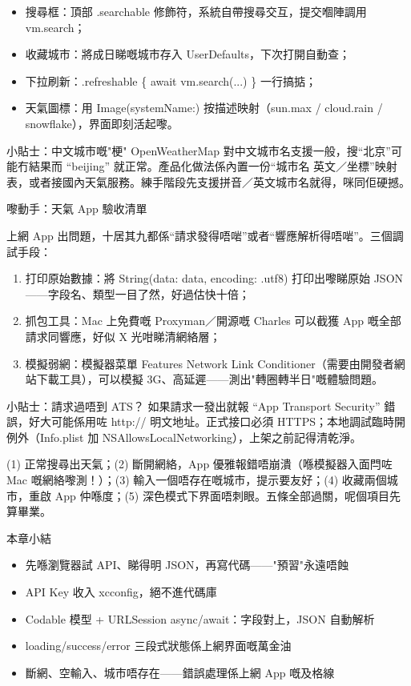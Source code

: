 
\begin{itemize}
  \item 搜尋框：頂部 .searchable 修飾符，系統自帶搜尋交互，提交嗰陣調用 vm.search；
  \item 收藏城市：將成日睇嘅城市存入 UserDefaults，下次打開自動查；
  \item 下拉刷新：.refreshable \{ await vm.search(...) \} 一行搞掂；
  \item 天氣圖標：用 Image(systemName:) 按描述映射（sun.max / cloud.rain / snowflake），界面即刻活起嚟。
\end{itemize}

\begin{tcbinfo}{小貼士：中文城市嘅"梗"}
OpenWeatherMap 對中文城市名支援一般，搜“北京”可能冇結果而 “beijing” 就正常。產品化做法係內置一份“城市名 英文／坐標”映射表，或者接國內天氣服務。練手階段先支援拼音／英文城市名就得，咪同佢硬撼。

\end{tcbinfo}

\begin{tcbpractice}{嚟動手：天氣 App 驗收清單}

上網 App 出問題，十居其九都係“請求發得唔啱”或者“響應解析得唔啱”。三個調試手段：

\begin{enumerate}
  \item 打印原始數據：將 String(data: data, encoding: .utf8) 打印出嚟睇原始 JSON——字段名、類型一目了然，好過估快十倍；
  \item 抓包工具：Mac 上免費嘅 Proxyman／開源嘅 Charles 可以截獲 App 嘅全部請求同響應，好似 X 光咁睇清網絡層；
  \item 模擬弱網：模擬器菜單 Features Network Link Conditioner（需要由開發者網站下載工具），可以模擬 3G、高延遲——測出"轉圈轉半日"嘅體驗問題。
\end{enumerate}

\begin{tcbinfo}{小貼士：請求過唔到 ATS？}
如果請求一發出就報 “App Transport Security” 錯誤，好大可能係用咗 http:// 明文地址。正式接口必須 HTTPS；本地調試臨時開例外（Info.plist 加 NSAllowsLocalNetworking），上架之前記得清乾淨。

\end{tcbinfo}

(1) 正常搜尋出天氣；(2) 斷開網絡，App 優雅報錯唔崩潰（喺模擬器入面閂咗 Mac 嘅網絡嚟測！）；(3) 輸入一個唔存在嘅城市，提示要友好；(4) 收藏兩個城市，重啟 App 仲喺度；(5) 深色模式下界面唔刺眼。五條全部過關，呢個項目先算畢業。

\end{tcbpractice}

\begin{tcbsummary}{本章小結}
\begin{itemize}
  \item 先喺瀏覽器試 API、睇得明 JSON，再寫代碼——"預習"永遠唔蝕
  \item API Key 收入 xcconfig，絕不進代碼庫
  \item Codable 模型 + URLSession async/await：字段對上，JSON 自動解析
  \item loading/success/error 三段式狀態係上網界面嘅萬金油
  \item 斷網、空輸入、城市唔存在——錯誤處理係上網 App 嘅及格線
\end{itemize}

\end{tcbsummary}
